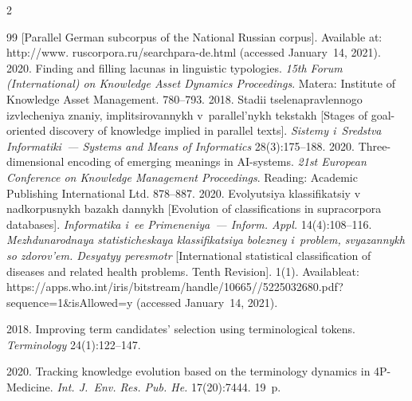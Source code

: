 \begin{multicols}{2}
{{\begin{thebibliography}{99}
[Parallel German subcorpus  of the National Russian corpus]. Available at: {\sf 
http://www. ruscorpora.ru/searchpara-de.html} (accessed January~14, 2021).
 2020. Finding and filling lacunas in linguistic typologies. \textit{15th Forum 
(International) on Knowledge Asset Dynamics Proceedings}. Matera: Institute of Knowledge 
Asset Management. 780--793.
 2018. Stadii tselenapravlennogo izvlecheniya znaniy, implitsirovannykh 
v~parallel'nykh tekstakh [Stages of goal-oriented discovery of knowledge implied in parallel 
texts]. \textit{Sistemy i~Sredstva Informatiki~--- Systems and Means of Informatics} 
28(3):175--188.
 2020. Three-dimensional encoding of emerging meanings in AI-systems. 
\textit{21st European Conference on Knowledge Management Proceedings}. Reading: 
Academic Publishing International Ltd. 878--887.
 2020. Evolyutsiya 
klassifikatsiy v nadkorpusnykh ba\-zakh dannykh [Evolution of classifications in supracorpora 
databases]. \textit{Informatika i~ee Primeneniya~--- Inform. \mbox{Appl.}} 14(4):108--116.
\textit{Mezhdunarodnaya statisticheskaya klassifikatsiya bo\-lez\-ney i~problem, svyazannykh so zdorov'em. 
Desyatyy peresmotr} [International 
statistical classification of diseases and related health problems. Tenth Revision]. 1(1).
Available\linebreak at: {\sf 
https://apps.who.int/iris/bitstream/handle/10665//5225032680.pdf?sequence=1\&isAllowed=y} (accessed 
January~14, 2021).

 2018. Improving term candidates' 
selection using terminological tokens. \textit{Terminology} 24(1):122--147.

 2020. 
Tracking knowledge evolution based on the terminology dynamics in 4P-Medicine. \textit{Int. 
J.~Env. Res. Pub. He.} 17(20):7444. 19~p.


\end{thebibliography}}}
\end{multicols}
